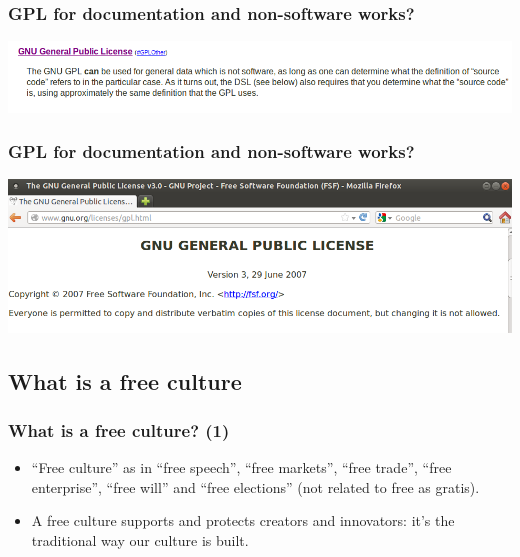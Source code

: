 \documentclass{beamer}
\begin{document}

\begin{frame}
\frametitle{GPL for documentation and non-software works?}


\includegraphics[scale=0.35,clip=true]{figs/gpg-for-doc.png}

\end{frame}


\begin{frame}
\frametitle{GPL for documentation and non-software works?}


\includegraphics[scale=0.35,clip=true]{figs/gpg-verbatim.png}

\end{frame}

\subsection{What is a free culture}
\begin{frame}
\frametitle{What is a free culture? (1)}
\begin{itemize}
\pause
\item ``Free culture'' as in ``\alert{free speech}'', ``\alert{free markets}'', ``\alert{free trade}'', ``\alert{free enterprise}'', ``\alert{free will}'' and ``\alert{free elections}'' (not related to free as gratis).
\item A free culture supports and protects creators and innovators: it's the traditional way our culture is built.
\end{itemize}

\end{frame}
\end{document}

